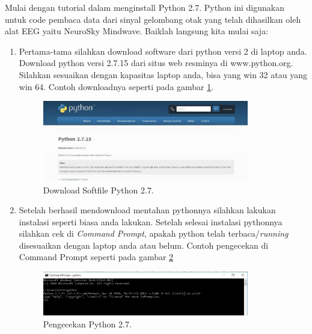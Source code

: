 Mulai dengan tutorial dalam menginstall Python 2.7. Python ini digunakan untuk code pembaca data dari sinyal gelombang otak yang telah dihasilkan oleh alat EEG yaitu NeuroSky Mindwave. Baiklah langsung kita mulai saja:
\begin{enumerate}
\item Pertama-tama silahkan download software dari python versi 2 di laptop anda. Download python versi 2.7.15 dari situs web resminya di www.python.org. Silahkan sesuaikan dengan kapasitas laptop anda, bisa yang win 32 atau yang win 64. Contoh downloadnya seperti pada gambar \ref{fig:python}.
\begin{figure}[!htbp]
	\centerline{\includegraphics[width=0.85\textwidth]{figures/8/python.jpg}}
	\caption{Download Softfile Python 2.7.}
	\label{fig:python}
\end{figure}

\item Setelah berhasil mendownload mentahan pythonnya silahkan lakukan instalasi seperti biasa anda lakukan. Setelah selesai instalasi pythonnya silahkan cek di \textit{Command Prompt}, apakah python telah terbaca/\textit{running} disesuaikan dengan laptop anda atau belum. Contoh pengecekan di Command Prompt seperti pada gambar \ref{fig:cek_python27}
\begin{figure}[!htbp]
	\centerline{\includegraphics[width=0.85\textwidth]{figures/8/cek_python27.jpg}}
	\caption{Pengecekan Python 2.7.}
	\label{fig:cek_python27}
\end{figure}


\end{enumerate}
